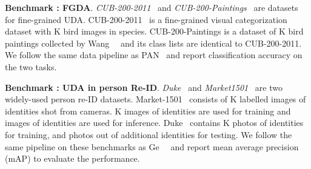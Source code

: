\documentclass[10pt,twocolumn,letterpaper]{article}
\begin{document}
\textbf{Benchmark : FGDA}. \textit{CUB-200-2011}~\cite{wah2011CUB-200-2011} and \textit{CUB-200-Paintings}~\cite{wang2020PAN} are datasets for fine-grained UDA.
CUB-200-2011~\cite{wah2011CUB-200-2011} is a fine-grained visual categorization dataset with K bird images in  species.
CUB-200-Paintings is a dataset of K bird paintings collected by Wang~\etal~\cite{wang2020PAN} and its class lists are identical to CUB-200-2011. We follow the same data pipeline as PAN~\cite{wang2020PAN} and report classification accuracy on the two tasks.

\textbf{Benchmark : UDA in person Re-ID}. \textit{Duke}~\cite{ristani2016Duke} and \textit{Market1501}~\cite{zheng2015Market1501} are two widely-used person re-ID datasets. Market-1501~\cite{zheng2015Market1501} consists of K labelled images of  identities shot from  cameras. K images of  identities are used for training and  images of  identities are used for inference. Duke~\cite{ristani2016Duke} contains K photos of  identities for training, and photos out of additional  identities for testing. We follow the same pipeline on these benchmarks as Ge~\etal~\cite{ge2020MMT} and report mean average precision (mAP) to evaluate the performance.
\end{document}
